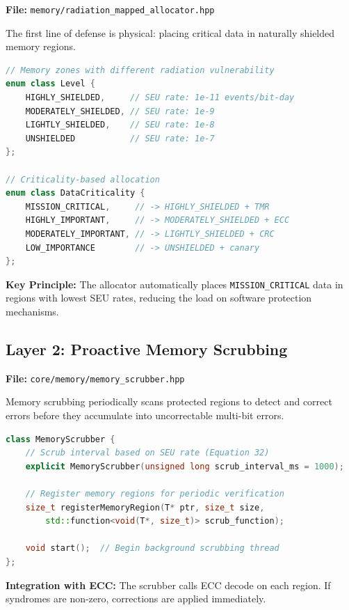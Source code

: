 \documentclass[11pt,a4paper]{article}
\begin{document}
\textbf{File:} \texttt{memory/radiation\_mapped\_allocator.hpp}

The first line of defense is physical: placing critical data in naturally shielded memory regions.

\begin{lstlisting}[language=C++, basicstyle=\footnotesize\ttfamily]
// Memory zones with different radiation vulnerability
enum class Level {
    HIGHLY_SHIELDED,     // SEU rate: 1e-11 events/bit-day
    MODERATELY_SHIELDED, // SEU rate: 1e-9
    LIGHTLY_SHIELDED,    // SEU rate: 1e-8
    UNSHIELDED           // SEU rate: 1e-7
};

// Criticality-based allocation
enum class DataCriticality {
    MISSION_CRITICAL,     // -> HIGHLY_SHIELDED + TMR
    HIGHLY_IMPORTANT,     // -> MODERATELY_SHIELDED + ECC
    MODERATELY_IMPORTANT, // -> LIGHTLY_SHIELDED + CRC
    LOW_IMPORTANCE        // -> UNSHIELDED + canary
};
\end{lstlisting}

\textbf{Key Principle:} The allocator automatically places \texttt{MISSION\_CRITICAL} data in regions with lowest SEU rates, reducing the load on software protection mechanisms.

\subsection{Layer 2: Proactive Memory Scrubbing}

\textbf{File:} \texttt{core/memory/memory\_scrubber.hpp}

Memory scrubbing periodically scans protected regions to detect and correct errors before they accumulate into uncorrectable multi-bit errors.

\begin{lstlisting}[language=C++, basicstyle=\footnotesize\ttfamily]
class MemoryScrubber {
    // Scrub interval based on SEU rate (Equation 32)
    explicit MemoryScrubber(unsigned long scrub_interval_ms = 1000);

    // Register memory regions for periodic verification
    size_t registerMemoryRegion(T* ptr, size_t size,
        std::function<void(T*, size_t)> scrub_function);

    void start();  // Begin background scrubbing thread
};
\end{lstlisting}

\textbf{Integration with ECC:} The scrubber calls ECC decode on each region. If syndromes are non-zero, corrections are applied immediately.
\end{document}
